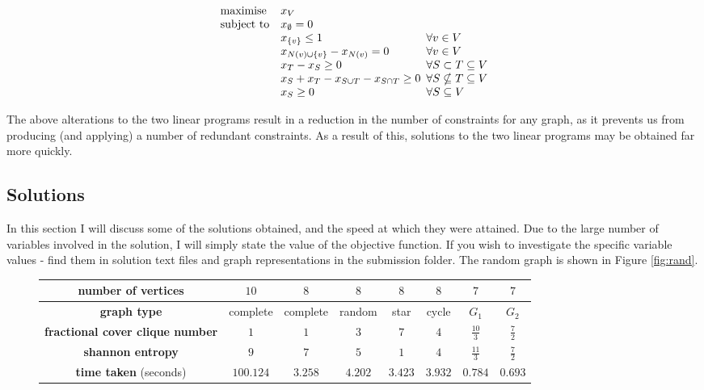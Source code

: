 \documentclass[12pt, a4paper]{article}
\begin{document}
\begin{equation*}
\begin{array}{ll@{}ll}
\text{maximise}  & x_V &\\
\text{subject to}& x_\emptyset = 0 &\\
                 &           x_{\{v\}} \leq 1  & \, \, \,  \forall v \in V\\
                 &x_{N(v)\cup \{v\}} - x_{N(v)} = 0&  \, \, \, \forall v \in V\\
                 &x_T-x_S \geq 0&  \, \, \, \forall S \subset T \subseteq V\\
                 &x_S + x_T - x_{S\cup T} - x_{S\cap T} \geq 0&   \, \, \,  \forall S\nsubseteq T \subseteq V \\
                 &           x_{S} \geq 0 & \, \, \,  \forall S \subseteq V \\
\end{array}
\end{equation*}

The above alterations to the two linear programs result in a reduction in the number of constraints for any graph, as it prevents us from producing (and applying) a number of redundant constraints. As a result of this, solutions to the two linear programs may be obtained far more quickly.

\subsection*{Solutions}
In this section I will discuss some of the solutions obtained, and the speed at which they were attained. Due to the large number of variables involved in the solution, I will simply state the value of the objective function. If you wish to investigate the specific variable values - find them in solution text files and graph representations in the submission folder. The random graph is shown in Figure \ref{fig:rand}.\\

\begin{figure}[h]
\begin{center}
\begin{tabular}{ |c|c|c|c|c|c|c|c| } 
\hline
 \bf{number of vertices} &$10$& $8$ & $8$ &$8$ & $8$& $7$ & $7$   \\
\hline
 \bf{graph type} &complete& complete & random & star & cycle& $G_1 $ & $G_2$ \\
\hline
\bf{fractional cover clique number} &$1$& $1$& $3$ & $7$& $4$ &$\frac{10}{3}$  & $\frac{7}{2}$    \\ 
\hline
\bf{shannon entropy} &$9$& $7$ &$5$ & $1$&$4$ & $\frac{11}{3}$ & $\frac{7}{2}$    \\ 
\hline
{\bf time taken} (seconds) &$100.124$ & $3.258$ & $4.202$ & $3.423$& $3.932$ & $0.784$ & $0.693$    \\ 
\hline
\end{tabular}
\end{center}
\label{fig:results}
\end{figure}
\end{document}
